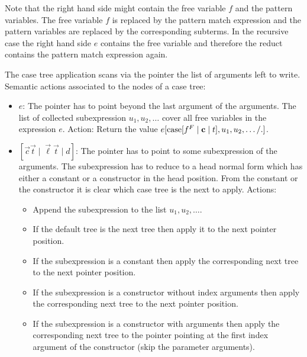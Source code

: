 Note that the right hand side might contain the free
variable $f$ and the pattern variables. The free variable $f$ is replaced by the
pattern match expression and the pattern variables are replaced by the
corresponding subterms. In the recursive case the right hand side $e$ contains
the free variable and therefore the reduct contains the pattern match expression
again.

The case tree application scans via the pointer the list of arguments left to
write. Semantic actions associated to the nodes of a case tree:
\begin{itemize}
    \item $e$: The pointer has to point beyond the last argument of the
        arguments. The list of collected subexpression $u_1, u_2, \ldots$ cover
        all free variables in the expression $e$. Action: Return the value
        $e[{\text{case}}[f^F \mid {\mathbf c} \mid t], u_1,u_2,\ldots / .]$.

    \item $[\vec c \vec t \mid \vec \ell \vec t \mid d]$:
        The pointer has to point to some subexpression of the arguments. The
        subexpression has to reduce to a head normal form which has either a
        constant or a constructor in the head position. From the constant or the
        constructor it is clear which case tree is the next to apply.
        Actions:
        \begin{itemize}
            \item Append the subexpression to the list $u_1,u_2,\ldots$.

            \item If the default tree is the next tree then apply it to the next
                pointer position.

            \item If the subexpression is a constant then apply the
                corresponding next tree to the next pointer position.

            \item If the subexpression is a constructor without index
                arguments then apply the corresponding next tree to the next
                pointer position.

            \item If the subexpression is a constructor with arguments then
                apply the corresponding next tree to the pointer pointing at the
                first index argument of the constructor (skip the parameter
                arguments).
        \end{itemize}
\end{itemize}




